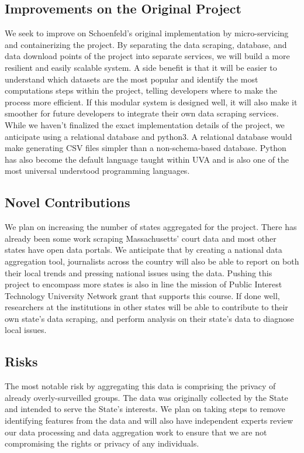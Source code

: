 \documentclass[12pt]{article}
\begin{document}
\subsection{Improvements on the Original Project}

\noindent We seek to improve on Schoenfeld's original implementation by micro-servicing and containerizing the project. 
By separating the data scraping, database, and data download points of the project into separate services, we will build a more resilient and easily scalable system.
A side benefit is that it will be easier to understand which datasets are the most popular and identify the most computations steps within the project, telling developers where to make the process more efficient.
If this modular system is designed well, it will also make it smoother for future developers to integrate their own data scraping services.
While we haven't finalized the exact implementation details of the project, we anticipate using a relational database and python3.
A relational database would make generating CSV files simpler than a non-schema-based database.
Python has also become the default language taught within UVA and is also one of the most universal understood programming languages.

\subsection{Novel Contributions}

\noindent We plan on increasing the number of states aggregated for the project. 
There has already been some work scraping Massachusetts' court data and most other states have open data portals.
We anticipate that by creating a national data aggregation tool, journalists across the country will also be able to report on both their local trends and pressing national issues using the data.
Pushing this project to encompass more states is also in line the mission of Public Interest Technology University Network grant that supports this course.
If done well, researchers at the institutions in other states will be able to contribute to their own state's data scraping, and perform analysis on their state's data to diagnose local issues.

\subsection{Risks}

\noindent The most notable risk by aggregating this data is comprising the privacy of already overly-surveilled groups.
The data was originally collected by the State and intended to serve the State's interests.
We plan on taking steps to remove identifying features from the data and will also have independent experts review our data processing and data aggregation work to ensure that we are not compromising the rights or privacy of any individuals.
\end{document}
